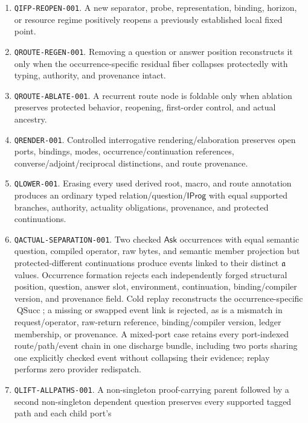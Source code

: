\documentclass[11pt,oneside]{article}
\newcommand{\QSucc}{\operatorname{QSucc}}
\newcommand{\AskRef}{\mathfrak a}
\begin{document}
\begin{enumerate}
      finite root/effectivity/coverage frontier and retains blocked, bounded, extension, and unknown
      exits.
\item \texttt{QIFP-REOPEN-001}. A new separator, probe, representation, binding, horizon, or
      resource regime positively reopens a previously established local fixed point.
\item \texttt{QROUTE-REGEN-001}. Removing a question or answer position reconstructs it only when
      the occurrence-specific residual fiber collapses protectedly with typing, authority, and
      provenance intact.
\item \texttt{QROUTE-ABLATE-001}. A recurrent route node is foldable only when ablation preserves
      protected behavior, reopening, first-order control, and actual ancestry.
\item \texttt{QRENDER-001}. Controlled interrogative rendering/elaboration preserves open ports,
      bindings, modes, occurrence/continuation references, converse/adjoint/reciprocal distinctions,
      and route provenance.
\item \texttt{QLOWER-001}. Erasing every used derived root, macro, and route annotation produces an
      ordinary typed relation/question/\(\mathsf{IProg}\) with equal supported branches, authority,
      actuality obligations, provenance, and protected continuations.
\item \texttt{QACTUAL-SEPARATION-001}. Two checked \(\mathsf{Ask}\) occurrences with equal semantic
      question, compiled operator, raw bytes, and semantic member projection but
      protected-different continuations produce events linked to their distinct \(\AskRef\) values.
      Occurrence formation rejects each independently forged structural position, question, answer
      slot, environment, continuation, binding/compiler version, and provenance field.
      Cold replay reconstructs the occurrence-specific \(\QSucc\); a missing or swapped event link
      is rejected, as is a mismatch in request/operator, raw-return reference, binding/compiler
      version, ledger membership, or provenance.  A mixed-port case retains every port-indexed
      route/path/event chain in one discharge bundle, including two ports sharing one explicitly
      checked event without collapsing their evidence; replay performs zero provider redispatch.
\item \texttt{QLIFT-ALLPATHS-001}. A non-singleton proof-carrying parent followed by a second
      non-singleton dependent question preserves every supported tagged path and each child port's

\end{enumerate}
\end{document}
